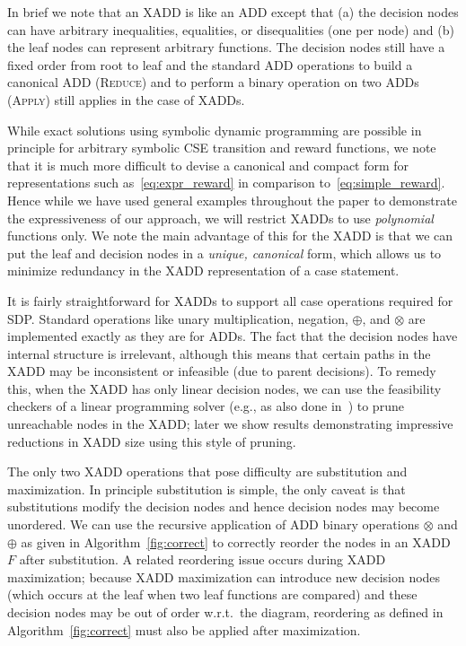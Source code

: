 \documentclass[letterpaper]{article}
\begin{document}
In brief we note that an XADD is like an ADD except that (a) the decision
nodes can have arbitrary inequalities, equalities, or disequalities (one
per node) and (b) the leaf nodes can represent arbitrary functions.
The decision nodes still have a fixed order from root to leaf
and the standard ADD
operations to build a canonical ADD (\textsc{Reduce}) and 
to perform a binary operation on two ADDs (\textsc{Apply}) 
still applies in the case of XADDs.

While exact solutions using symbolic dynamic
programming are possible in principle for arbitrary symbolic CSE transition
and reward functions, we note that it is much more difficult to
devise a canonical and compact form for representations 
such as~\eqref{eq:expr_reward}
in comparison to~\eqref{eq:simple_reward}.
Hence while we have used general examples throughout the paper
to demonstrate the expressiveness of our approach, we will restrict
XADDs to use \emph{polynomial} functions only.  We note the main advantage
of this for the XADD is that we can put the leaf and decision nodes
in a \emph{unique, canonical} form, which allows us to minimize 
redundancy in the XADD representation of a case statement.

It is fairly straightforward for XADDs to support all case operations
required for SDP.  Standard operations like unary multiplication,
negation, $\oplus$, and $\otimes$ are implemented exactly as they
are for ADDs.  The fact that the decision nodes have internal structure
is irrelevant, although this means that certain paths in the XADD
may be inconsistent or infeasible (due to parent decisions).  To
remedy this, when the XADD has only linear decision 
nodes, we can use the feasibility checkers of
a linear programming solver (e.g., as also done in~\cite{penberthy94}) 
to prune unreachable nodes in the XADD; later we show results demonstrating
impressive reductions in XADD size using this style of pruning.

The only two XADD operations that pose difficulty are substitution
and maximization.  In principle substitution is simple, the only
caveat is that substitutions modify the decision nodes and hence
decision nodes may become unordered.  We can use the 
recursive application of ADD binary operations $\otimes$ and $\oplus$ 
as given in Algorithm~\ref{fig:correct} to correctly reorder the
nodes in an XADD $F$ after substitution.  A related reordering
issue occurs during XADD maximization; because XADD maximization
can introduce new decision nodes (which occurs at the leaf when
two leaf functions are compared) and these decision nodes may
be out of order w.r.t.\ the diagram, reordering as defined
in Algorithm~\ref{fig:correct} must also be applied after
maximization.  
\end{document}

